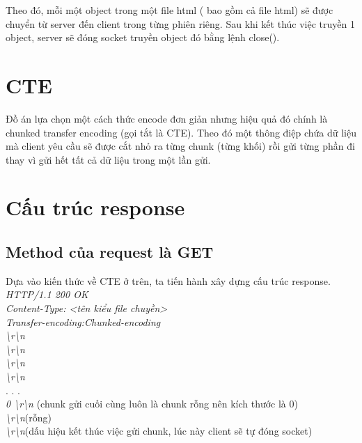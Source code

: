 \documentclass[14pt]{extreport}
\begin{document}
Theo đó, mỗi một object trong một file html ( bao gồm cả file html) sẽ được chuyển từ server đến client trong từng phiên riêng. Sau khi kết thúc việc truyền 1 object, server sẽ đóng socket truyền object đó bằng lệnh close().
\section{CTE}
Đồ án lựa chọn một cách thức encode đơn giản nhưng hiệu quả đó chính là chunked transfer encoding (gọi tắt là CTE). Theo đó một thông điệp chứa dữ liệu mà client yêu cầu sẽ được cắt nhỏ ra từng chunk (từng khối) rồi gửi từng phần đi thay vì gửi hết tất cả dữ liệu trong một lần gửi.
\section{Cấu trúc response}

\subsection{Method của request là GET}
Dựa vào kiến thức về CTE ở trên, ta tiến hành xây dựng cấu trúc response.\\
{\it HTTP/1.1 200 OK}\\
{\it Content-Type: <tên kiểu file chuyền>}\\
{\it Transfer-encoding:Chunked-encoding}\\
{\it <kích thước chunk01 viết dưới dạng hex> \textbackslash r\textbackslash n }\\
{\it <data của chunk01>\textbackslash r\textbackslash n}\\
{\it <kích thước chunk02 viết dưới dạng hex> \textbackslash r\textbackslash n }\\
{\it <data của chunk02>\textbackslash r\textbackslash n}\\

.
.
.\\
{\it 0 \textbackslash r\textbackslash n }(chunk gửi cuối cùng luôn là chunk rỗng nên kích thước là 0)\\
{\it <data của chunk cuối >\textbackslash r\textbackslash n}(rỗng)\\
{\it \textbackslash r\textbackslash n}(dấu hiệu kết thúc việc gửi chunk, lúc này client sẽ tự đóng socket)
\end{document}
